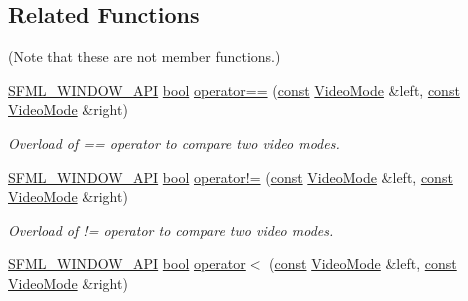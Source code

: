 \subsection*{Related Functions}
(Note that these are not member functions.) \begin{DoxyCompactItemize}
\item 
\hyperlink{sfml_2dep_2_s_f_m_l-2_84_82_2include_2_s_f_m_l_2_window_2_export_8hpp_a1ab885b7907ee088350359516d68be64}{S\-F\-M\-L\-\_\-\-W\-I\-N\-D\-O\-W\-\_\-\-A\-P\-I} \hyperlink{term__entry_8h_a002004ba5d663f149f6c38064926abac}{bool} \hyperlink{classsf_1_1_video_mode_a03c51c119811ffd4403c6e2bcbd4ceaf}{operator==} (\hyperlink{term__entry_8h_a57bd63ce7f9a353488880e3de6692d5a}{const} \hyperlink{classsf_1_1_video_mode}{Video\-Mode} \&left, \hyperlink{term__entry_8h_a57bd63ce7f9a353488880e3de6692d5a}{const} \hyperlink{classsf_1_1_video_mode}{Video\-Mode} \&right)
\begin{DoxyCompactList}\small\item\em Overload of == operator to compare two video modes. \end{DoxyCompactList}\item 
\hyperlink{sfml_2dep_2_s_f_m_l-2_84_82_2include_2_s_f_m_l_2_window_2_export_8hpp_a1ab885b7907ee088350359516d68be64}{S\-F\-M\-L\-\_\-\-W\-I\-N\-D\-O\-W\-\_\-\-A\-P\-I} \hyperlink{term__entry_8h_a002004ba5d663f149f6c38064926abac}{bool} \hyperlink{classsf_1_1_video_mode_abd7bf172d318085ea572b8c10033f7b7}{operator!=} (\hyperlink{term__entry_8h_a57bd63ce7f9a353488880e3de6692d5a}{const} \hyperlink{classsf_1_1_video_mode}{Video\-Mode} \&left, \hyperlink{term__entry_8h_a57bd63ce7f9a353488880e3de6692d5a}{const} \hyperlink{classsf_1_1_video_mode}{Video\-Mode} \&right)
\begin{DoxyCompactList}\small\item\em Overload of != operator to compare two video modes. \end{DoxyCompactList}\item 
\hyperlink{sfml_2dep_2_s_f_m_l-2_84_82_2include_2_s_f_m_l_2_window_2_export_8hpp_a1ab885b7907ee088350359516d68be64}{S\-F\-M\-L\-\_\-\-W\-I\-N\-D\-O\-W\-\_\-\-A\-P\-I} \hyperlink{term__entry_8h_a002004ba5d663f149f6c38064926abac}{bool} \hyperlink{classsf_1_1_video_mode_a8e3d8fa57fa10dca05edbc34c4e2f1a8}{operator$<$} (\hyperlink{term__entry_8h_a57bd63ce7f9a353488880e3de6692d5a}{const} \hyperlink{classsf_1_1_video_mode}{Video\-Mode} \&left, \hyperlink{term__entry_8h_a57bd63ce7f9a353488880e3de6692d5a}{const} \hyperlink{classsf_1_1_video_mode}{Video\-Mode} \&right)

\end{DoxyCompactItemize}
